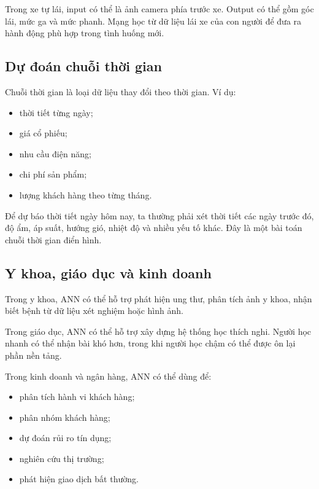 \begin{vidu}
Trong xe tự lái, input có thể là ảnh camera phía trước xe. Output có thể gồm góc lái, mức ga và mức phanh. Mạng học từ dữ liệu lái xe của con người để đưa ra hành động phù hợp trong tình huống mới.
\end{vidu}

\subsection{Dự đoán chuỗi thời gian}

Chuỗi thời gian là loại dữ liệu thay đổi theo thời gian. Ví dụ:

\begin{itemize}
    \item thời tiết từng ngày;
    \item giá cổ phiếu;
    \item nhu cầu điện năng;
    \item chi phí sản phẩm;
    \item lượng khách hàng theo từng tháng.
\end{itemize}

\begin{vidu}
Để dự báo thời tiết ngày hôm nay, ta thường phải xét thời tiết các ngày trước đó, độ ẩm, áp suất, hướng gió, nhiệt độ và nhiều yếu tố khác. Đây là một bài toán chuỗi thời gian điển hình.
\end{vidu}

\subsection{Y khoa, giáo dục và kinh doanh}

Trong y khoa, ANN có thể hỗ trợ phát hiện ung thư, phân tích ảnh y khoa, nhận biết bệnh từ dữ liệu xét nghiệm hoặc hình ảnh.

Trong giáo dục, ANN có thể hỗ trợ xây dựng hệ thống học thích nghi. Người học nhanh có thể nhận bài khó hơn, trong khi người học chậm có thể được ôn lại phần nền tảng.

Trong kinh doanh và ngân hàng, ANN có thể dùng để:

\begin{itemize}
    \item phân tích hành vi khách hàng;
    \item phân nhóm khách hàng;
    \item dự đoán rủi ro tín dụng;
    \item nghiên cứu thị trường;
    \item phát hiện giao dịch bất thường.
\end{itemize}


